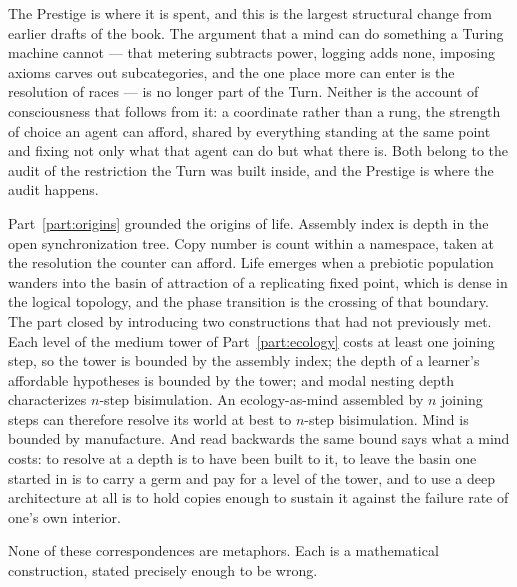 The Prestige is where it is spent, and this is the largest structural
change from earlier drafts of the book.
The argument that a mind can do something a Turing machine cannot ---
that metering subtracts power, logging adds none, imposing axioms carves
out subcategories, and the one place more can enter is the resolution of
races --- is no longer part of the Turn.
Neither is the account of consciousness that follows from it: a
coordinate rather than a rung, the strength of choice an agent can afford,
shared by everything standing at the same point and fixing not only what
that agent can do but what there is.
Both belong to the audit of the restriction the Turn was built inside,
and the Prestige is where the audit happens.

Part~\ref{part:origins} grounded the origins of life.
Assembly index is depth in the open synchronization tree.
Copy number is count within a namespace, taken at the resolution the
counter can afford.
Life emerges when a prebiotic population wanders into the basin of
attraction of a replicating fixed point, which is dense in the logical
topology, and the phase transition is the crossing of that boundary.
The part closed by introducing two constructions that had not previously
met.
Each level of the medium tower of Part~\ref{part:ecology} costs at least
one joining step, so the tower is bounded by the assembly index; the
depth of a learner's affordable hypotheses is bounded by the tower; and
modal nesting depth characterizes $n$-step bisimulation.
An ecology-as-mind assembled by $n$ joining steps can therefore resolve
its world at best to $n$-step bisimulation.
Mind is bounded by manufacture.
And read backwards the same bound says what a mind costs: to resolve at a
depth is to have been built to it, to leave the basin one started in is to
carry a germ and pay for a level of the tower, and to use a deep
architecture at all is to hold copies enough to sustain it against the
failure rate of one's own interior.

None of these correspondences are metaphors.
Each is a mathematical construction, stated precisely enough to be wrong.
